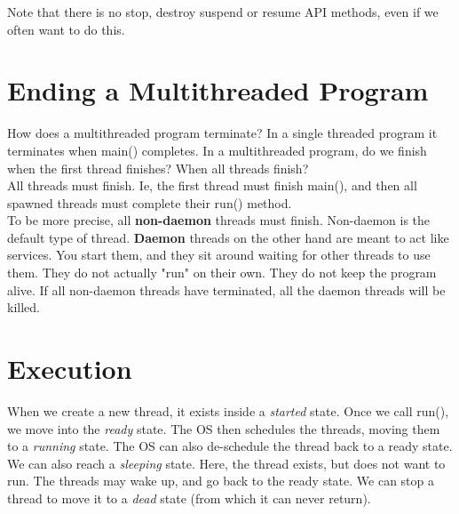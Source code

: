 \documentclass[12pt]{article}
\theoremstyle{definition}
\begin{document}
Note that there is no stop, destroy suspend or resume API methods, even if we often want to do this.

\section{Ending a Multithreaded Program}
How does a multithreaded program terminate? In a single threaded program it terminates when main() completes. In a multithreaded program, do we finish when the first thread finishes? When all threads finish?
\\ \linebreak
All threads must finish. Ie, the first thread must finish main(), and then all spawned threads must complete their run() method. 
\\ \linebreak
To be more precise, all \textbf{non-daemon} threads must finish. Non-daemon is the default type of thread. \textbf{Daemon} threads on the other hand are meant to act like services. You start them, and they sit around waiting for other threads to use them. They do not actually "run" on their own. They do not keep the program alive. If all non-daemon threads have terminated, all the daemon threads will be killed. 

\section{Execution}
When we create a new thread, it exists inside a \textit{started} state. Once we call run(), we move into the\textit{ ready} state. The OS then schedules the threads, moving them to a \textit{running} state. The OS can also de-schedule the thread back to a ready state. We can also reach a \textit{sleeping} state. Here, the thread exists, but does not want to run. The threads may wake up, and go back to the ready state. We can stop a thread to move it to a \textit{dead} state (from which it can never return).
\\ \linebreak
\end{document}
